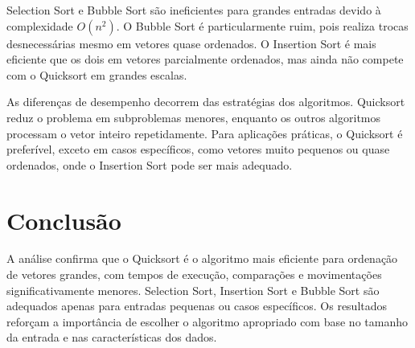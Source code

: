 \documentclass[12pt]{article}
\begin{document}
	Selection Sort e Bubble Sort são ineficientes para grandes entradas devido à complexidade $O(n^2)$. O Bubble Sort é particularmente ruim, pois realiza trocas desnecessárias mesmo em vetores quase ordenados. O Insertion Sort é mais eficiente que os dois em vetores parcialmente ordenados, mas ainda não compete com o Quicksort em grandes escalas.
	
	As diferenças de desempenho decorrem das estratégias dos algoritmos. Quicksort reduz o problema em subproblemas menores, enquanto os outros algoritmos processam o vetor inteiro repetidamente. Para aplicações práticas, o Quicksort é preferível, exceto em casos específicos, como vetores muito pequenos ou quase ordenados, onde o Insertion Sort pode ser mais adequado.
	
	\section{Conclusão}
	A análise confirma que o Quicksort é o algoritmo mais eficiente para ordenação de vetores grandes, com tempos de execução, comparações e movimentações significativamente menores. Selection Sort, Insertion Sort e Bubble Sort são adequados apenas para entradas pequenas ou casos específicos. Os resultados reforçam a importância de escolher o algoritmo apropriado com base no tamanho da entrada e nas características dos dados.
	
\end{document}
